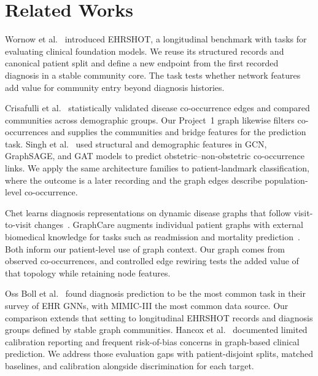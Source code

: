 \section{Related Works}
Wornow et al.~\cite{wornow2023} introduced EHRSHOT, a longitudinal benchmark with tasks for evaluating clinical foundation models. We reuse its structured records and canonical patient split and define a new endpoint from the first recorded diagnosis in a stable community core. The task tests whether network features add value for community entry beyond diagnosis histories.

Crisafulli et al.~\cite{crisafulli2026} statistically validated disease co-occurrence edges and compared communities across demographic groups. Our Project~1 graph likewise filters co-occurrences and supplies the communities and bridge features for the prediction task. Singh et al.~\cite{singh2026} used structural and demographic features in GCN, GraphSAGE, and GAT models to predict obstetric--non-obstetric co-occurrence links. We apply the same architecture families to patient-landmark classification, where the outcome is a later recording and the graph edges describe population-level co-occurrence.

Chet learns diagnosis representations on dynamic disease graphs that follow visit-to-visit changes~\cite{lu2022chet}. GraphCare augments individual patient graphs with external biomedical knowledge for tasks such as readmission and mortality prediction~\cite{jiang2024graphcare}. Both inform our patient-level use of graph context. Our graph comes from observed co-occurrences, and controlled edge rewiring tests the added value of that topology while retaining node features.

Oss Boll et al.~\cite{boll2024} found diagnosis prediction to be the most common task in their survey of EHR GNNs, with MIMIC-III the most common data source. Our comparison extends that setting to longitudinal EHRSHOT records and diagnosis groups defined by stable graph communities. Hancox et al.~\cite{hancox2024} documented limited calibration reporting and frequent risk-of-bias concerns in graph-based clinical prediction. We address those evaluation gaps with patient-disjoint splits, matched baselines, and calibration alongside discrimination for each target.
